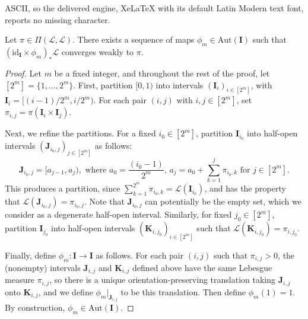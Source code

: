 \documentclass[10pt,a4paper]{amsart}
\begin{document}
ASCII, so the delivered engine, XeLaTeX with its default Latin Modern text font, reports no missing character.
\begin{lemma}\label{lem:map_approximation}
Let $\pi \in \Pi(\mathscr{L},\mathscr{L})$. There exists a sequence of maps $\phi_m \in \mathrm{Aut}(\mathbf{I})$ such that $(\mathrm{id}_\mathbf{I} \times \phi_m)_\ast \mathscr{L}$ converges weakly to $\pi$. 
\end{lemma}

\begin{proof}
    Let $m$ be a fixed integer, and throughout the rest of the proof, let $[2^m] = \{1,\ldots,2^m\}$. First, partition $[0,1)$  into intervals $(\mathbf{I}_i)_{i \in [2^m]}$, with $\mathbf{I}_i = [(i-1)/2^m, i/2^m)$. For each pair $(i,j)$ with $i,j \in [2^m]$, set $\pi_{i,j} = \pi(\mathbf{I}_i \times \mathbf{I}_j)$.

    Next, we refine the partitions. For a fixed $i_0 \in [2^m]$, partition $\mathbf{I}_{i_0}$ into half-open intervals $(\mathbf{J}_{i_0,j})_{j \in [2^m]}$ as follows:
    \[
    \mathbf{J}_{i_0,j} = [a_{j-1},a_{j}), \mbox{ where } a_0 = \frac{(i_0-1)}{2^m}, \, a_j = a_0 + \sum_{k=1}^{j} \pi_{i_0,k} \mbox{ for } j \in [2^m].
    \]
    This produces a partition, since $\sum_{k=1}^{2^m} \pi_{i_0,k} = \mathscr{L}(\mathbf{I}_{i_0})$, and has the property that $\mathscr{L}(\mathbf{J}_{i_0,j}) = \pi_{i_0,j}$.
    Note that $\mathbf{J}_{i_0,j}$ can potentially be the empty set, which we consider as a degenerate half-open interval.
    Similarly, for fixed $j_0 \in [2^m]$, partition $\mathbf{I}_{j_0}$ into half-open intervals $(\mathbf{K}_{i,j_0})_{i \in [2^m]}$ such that $\mathscr{L}(\mathbf{K}_{i,j_0}) = \pi_{i,j_0}$. 

    Finally, define $\phi_m:\mathbf{I} \to \mathbf{I}$ as follows. For each pair $(i,j)$ such that $\pi_{i,j} > 0$, the (nonempty) intervals $\mathbf{J}_{i,j}$ and $\mathbf{K}_{i,j}$ defined above have the same Lebesgue measure  $\pi_{i,j}$, so there is a unique orientation-preserving translation taking  $\mathbf{J}_{i,j}$ onto $\mathbf{K}_{i,j}$, and we define $\phi_m|_{\mathbf{J}_{i,j}}$ to be this translation. Then define $\phi_m(1) = 1$. By construction, $\phi_m \in \mathrm{Aut}(\mathbf{I})$.


\end{proof}
\end{document}
